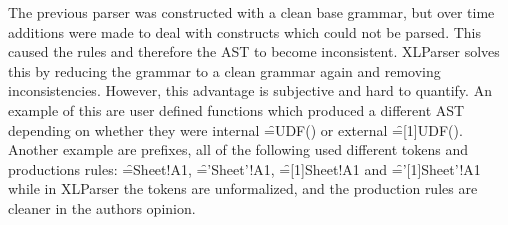 \noindent{}

The previous parser was constructed with a clean base grammar, but over time additions were made to deal with constructs which could not be parsed.
This caused the rules and therefore the AST to become inconsistent.
XLParser solves this by reducing the grammar to a clean grammar again and removing inconsistencies.
However, this advantage is subjective and hard to quantify.
An example of this are user defined functions which produced a different AST depending on whether they were internal \f{=UDF()} or external \f{=[1]UDF()}.
Another example are prefixes, all of the following used different tokens and productions rules: \f{=Sheet!A1}, \f{='Sheet'!A1}, \f{=[1]Sheet!A1} and \f{='[1]Sheet'!A1} while in XLParser the tokens are unformalized, and the production rules are cleaner in the authors opinion.